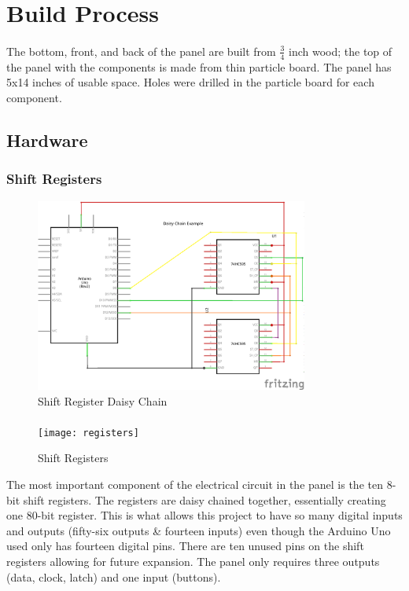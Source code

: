 \documentclass[12pt,a4paper]{article}
\begin{document}
\section{Build Process}
\paragraph{}
The bottom, front, and back of the panel are built from \(\frac{3}{4}\)  inch wood; the top of the panel with the components is made from thin particle board. The panel has 5x14 inches of usable space. Holes were drilled in the particle board for each component.
\newpage
\subsection{Hardware}
\subsubsection{Shift Registers}
\begin{figure}[h]
	\centering
	\includegraphics[width=0.8\textwidth]{daisy_chain}
	\caption{Shift Register Daisy Chain}
	\label{fig:daisy_chain}
\end{figure}
\paragraph{}
\begin{figure}
	\vspace*{-0.5cm}
	\centering
	\texttt{[image: registers]}
	\caption{Shift Registers}
	\label{fig:circuit}
\end{figure}
The most important component of the electrical circuit in the panel is the ten 8-bit shift registers. The registers are daisy chained together, essentially creating one 80-bit register. This is what allows this project to have so many digital inputs and outputs (fifty-six outputs \& fourteen inputs) even though the Arduino Uno used only has fourteen digital pins. There are ten unused pins on the shift registers allowing for future expansion. The panel only requires three outputs (data, clock, latch) and one input (buttons).
\end{document}
